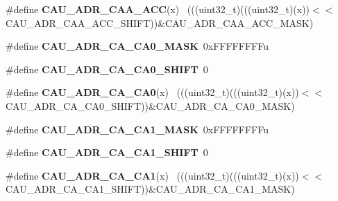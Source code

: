\begin{DoxyCompactItemize}
\item 
\hypertarget{group___c_a_u___register___masks_ga9a25f11176d0a475fc2ab292a80aaf46}{}\#define {\bfseries C\+A\+U\+\_\+\+A\+D\+R\+\_\+\+C\+A\+A\+\_\+\+A\+C\+C}(x)                                          ~(((uint32\+\_\+t)(((uint32\+\_\+t)(x))$<$$<$C\+A\+U\+\_\+\+A\+D\+R\+\_\+\+C\+A\+A\+\_\+\+A\+C\+C\+\_\+\+S\+H\+I\+F\+T))\&C\+A\+U\+\_\+\+A\+D\+R\+\_\+\+C\+A\+A\+\_\+\+A\+C\+C\+\_\+\+M\+A\+S\+K)\label{group___c_a_u___register___masks_ga9a25f11176d0a475fc2ab292a80aaf46}

\item 
\hypertarget{group___c_a_u___register___masks_ga414839bf216530416ea2338f5027fd46}{}\#define {\bfseries C\+A\+U\+\_\+\+A\+D\+R\+\_\+\+C\+A\+\_\+\+C\+A0\+\_\+\+M\+A\+S\+K}~0x\+F\+F\+F\+F\+F\+F\+F\+Fu\label{group___c_a_u___register___masks_ga414839bf216530416ea2338f5027fd46}

\item 
\hypertarget{group___c_a_u___register___masks_ga2e21fe07cc0b8acdef6e46075cc75770}{}\#define {\bfseries C\+A\+U\+\_\+\+A\+D\+R\+\_\+\+C\+A\+\_\+\+C\+A0\+\_\+\+S\+H\+I\+F\+T}~0\label{group___c_a_u___register___masks_ga2e21fe07cc0b8acdef6e46075cc75770}

\item 
\hypertarget{group___c_a_u___register___masks_gaa0dd251636974b4d32ecc3f9e887efe1}{}\#define {\bfseries C\+A\+U\+\_\+\+A\+D\+R\+\_\+\+C\+A\+\_\+\+C\+A0}(x)                                            ~(((uint32\+\_\+t)(((uint32\+\_\+t)(x))$<$$<$C\+A\+U\+\_\+\+A\+D\+R\+\_\+\+C\+A\+\_\+\+C\+A0\+\_\+\+S\+H\+I\+F\+T))\&C\+A\+U\+\_\+\+A\+D\+R\+\_\+\+C\+A\+\_\+\+C\+A0\+\_\+\+M\+A\+S\+K)\label{group___c_a_u___register___masks_gaa0dd251636974b4d32ecc3f9e887efe1}

\item 
\hypertarget{group___c_a_u___register___masks_gaa06ea4a2e4659354d7720c10f40f491c}{}\#define {\bfseries C\+A\+U\+\_\+\+A\+D\+R\+\_\+\+C\+A\+\_\+\+C\+A1\+\_\+\+M\+A\+S\+K}~0x\+F\+F\+F\+F\+F\+F\+F\+Fu\label{group___c_a_u___register___masks_gaa06ea4a2e4659354d7720c10f40f491c}

\item 
\hypertarget{group___c_a_u___register___masks_ga0627f84884a77f1e20570b01eacc50e8}{}\#define {\bfseries C\+A\+U\+\_\+\+A\+D\+R\+\_\+\+C\+A\+\_\+\+C\+A1\+\_\+\+S\+H\+I\+F\+T}~0\label{group___c_a_u___register___masks_ga0627f84884a77f1e20570b01eacc50e8}

\item 
\hypertarget{group___c_a_u___register___masks_ga2ed32d10545a2f7c9d76f6ef2ce42f82}{}\#define {\bfseries C\+A\+U\+\_\+\+A\+D\+R\+\_\+\+C\+A\+\_\+\+C\+A1}(x)                                            ~(((uint32\+\_\+t)(((uint32\+\_\+t)(x))$<$$<$C\+A\+U\+\_\+\+A\+D\+R\+\_\+\+C\+A\+\_\+\+C\+A1\+\_\+\+S\+H\+I\+F\+T))\&C\+A\+U\+\_\+\+A\+D\+R\+\_\+\+C\+A\+\_\+\+C\+A1\+\_\+\+M\+A\+S\+K)\label{group___c_a_u___register___masks_ga2ed32d10545a2f7c9d76f6ef2ce42f82}


\end{DoxyCompactItemize}
